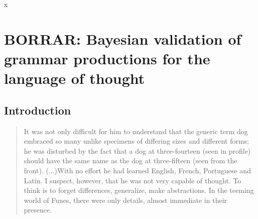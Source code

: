 x

\chapter{BORRAR: Bayesian validation of grammar productions for the language of thought}

\section{Introduction}
\blockquote{It was not only difficult for him to understand that the generic term dog embraced so many unlike specimens of differing sizes and different forms; he was disturbed by the fact that a dog at three-fourteen (seen in profile) should have the same name as the dog at three-fifteen (seen from the front). (...)With no effort he had learned English, French, Portuguese and Latin. I suspect, however, that he was not very capable of thought. To think is to forget differences, generalize, make abstractions. In the teeming world of Funes, there were only details, almost immediate in their presence. \cite{funes}}

